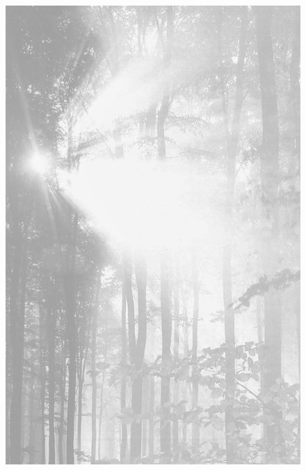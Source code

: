 \documentclass[ngerman,a4paper,11pt]{scrreprt}
\begin{document}
\begin{figure}[H]
\centering
\includegraphics[width=\textwidth,height=.8\textheight]{Bilder/Bilder/./750_0010_6103_TA_DS_wald2009.png}
\end{figure}
\end{document}
